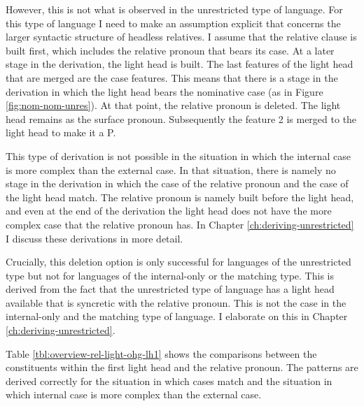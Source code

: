 However, this is not what is observed in the unrestricted type of language.
For this type of language I need to make an assumption explicit that concerns the larger syntactic structure of headless relatives. I assume that the relative clause is built first, which includes the relative pronoun that bears its case.
At a later stage in the derivation, the light head is built. The last features of the light head that are merged are the case features. This means that there is a stage in the derivation in which the light head bears the nominative case (as in Figure \ref{fig:nom-nom-unres}). At that point, the relative pronoun is deleted. The light head remains as the surface pronoun. Subsequently the feature 2 is merged to the light head to make it a P.

This type of derivation is not possible in the situation in which the internal case is more complex than the external case. In that situation, there is namely no stage in the derivation in which the case of the relative pronoun and the case of the light head match. The relative pronoun is namely built before the light head, and even at the end of the derivation the light head does not have the more complex case that the relative pronoun has.
In Chapter \ref{ch:deriving-unrestricted} I discuss these derivations in more detail.

Crucially, this deletion option is only successful for languages of the unrestricted type but not for languages of the internal-only or the matching type. This is derived from the fact that the unrestricted type of language has a light head available that is syncretic with the relative pronoun. This is not the case in the internal-only and the matching type of language. I elaborate on this in Chapter \ref{ch:deriving-unrestricted}.

Table \ref{tbl:overview-rel-light-ohg-lh1} shows the comparisons between the constituents within the first light head and the relative pronoun. The patterns are derived correctly for the situation in which cases match and the situation in which internal case is more complex than the external case.

